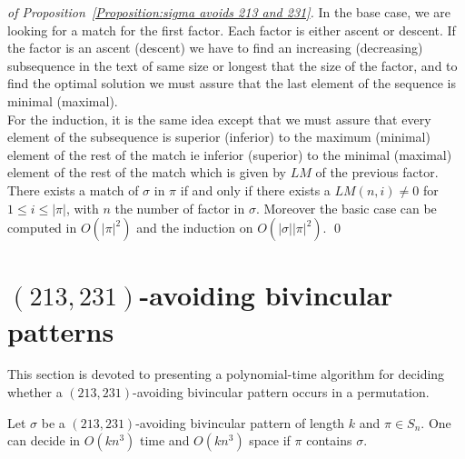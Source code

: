\documentclass[a4paper]{llncs}
\newcommand{\ptext}{\pi}
\newcommand{\pmotif}{\sigma}
\newcounter{num}
\begin{document}
\begin{proof}[of Proposition~\ref{Proposition:sigma avoids 213 and 231}]
In the base case,
we are looking for a match for the first factor.
Each factor is either ascent or descent.
If the factor is an ascent (descent)
we have to find an increasing (decreasing) subsequence
in the text of same size or longest that
the size of the factor,
and to find the optimal solution
we must assure that the last element
of the sequence is minimal (maximal).\\
For the induction, it is the same idea
except that we must assure that
every element of the subsequence is superior (inferior)
to the maximum (minimal) element of the rest of the match
ie inferior (superior) to the minimal (maximal) element of the rest of the match
which is given by $LM$ of
the previous factor.\\

There exists a match of $\pmotif$ in $\ptext$ if and only if
there exists a $LM(n,i)\neq 0$ for $1 \leq i \leq |\ptext|$,
with $n$ the number of factor in $\pmotif$.
Moreover the basic case can be computed in $O(|\ptext|^2)$
and the induction on $O(|\pmotif||\ptext|^2)$.
\qed
\end{proof}


\section{$(213,231)$-avoiding bivincular patterns}
	\label{section:bivincular}

		This section is devoted to presenting a polynomial-time algorithm for deciding whether
	a $(213,231)$-avoiding bivincular pattern occurs in a permutation.

	\begin{proposition}
		\label{Proposition:bivincular pattern}
			Let $\sigma$ be a $(213,231)$-avoiding bivincular pattern of length $k$
			and $\pi \in S_n$.
			One can decide in $O(kn^3)$ time
			and $O(kn^3)$ space if $\pi$ contains $\sigma$.
	\end{proposition}
\end{document}
